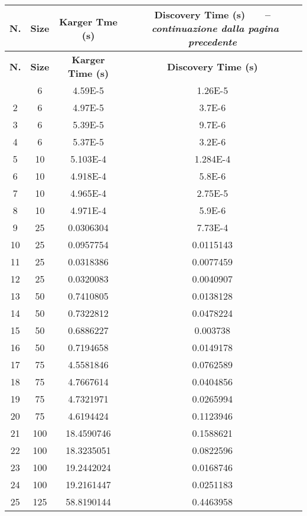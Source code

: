 \begin{center}
	\begin{longtable}{|c|c|c|c|}	
		\hline
		\textbf{N.} & \textbf{Size} & \textbf{Karger Tme (s)} & \textbf{Discovery Time (s)}
		\endfirsthead
		{\tablename\ \thetable\ \ --\  \textit{continuazione dalla pagina precedente}} \\
		\hline
		\textbf{N.} & \textbf{Size} & \textbf{Karger Time (s)} & \textbf{Discovery Time (s)}
		\endhead
		\hline {\textit{Continua nella pagina seguente}} \\
		\endfoot  
		\endlastfoot
		\hline
		1 & 6 & 4.59E-5	 & 1.26E-5 \\			    
		2 & 6 & 4.97E-5	 & 3.7E-6 \\			   	
		3 & 6 & 5.39E-5	 & 9.7E-6 \\		   		
		4 & 6 & 5.37E-5	 & 3.2E-6 \\			    
		5 & 10 & 5.103E-4 & 1.284E-4 \\	   		
		6 & 10 & 4.918E-4 & 5.8E-6 \\			  	
		7 & 10 & 4.965E-4 & 2.75E-5 \\			    
		8 & 10 & 4.971E-4 & 5.9E-6 \\			   	
		9 & 25 & 0.0306304 & 7.73E-4 \\
		10 & 25 & 0.0957754 & 0.0115143 \\		   	
		11 & 25 & 0.0318386 & 0.0077459 \\			
		12 & 25 & 0.0320083 & 0.0040907 \\	  		
		13 & 50 & 0.7410805 & 0.0138128 \\		    
		14 & 50 & 0.7322812 & 0.0478224 \\	    	
		15 & 50 & 0.6886227 & 0.003738 \\	  		
		16 & 50 & 0.7194658 & 0.0149178 \\	        
		17 & 75 & 4.5581846 & 0.0762589 \\	   		
		18 & 75 & 4.7667614 & 0.0404856 \\	  		
		19 & 75 & 4.7321971 & 0.0265994 \\	   		
		20 & 75 & 4.6194424 & 0.1123946 \\		  	
		21 & 100 & 18.4590746 & 0.1588621 \\	 
		22 & 100 & 18.3235051 & 0.0822596 \\	 
		23 & 100 & 19.2442024 & 0.0168746 \\		 
		24 & 100 & 19.2161447 & 0.0251183 \\		 
		25 & 125 & 58.8190144 & 0.4463958 \\	  

\end{longtable}
\end{center}
